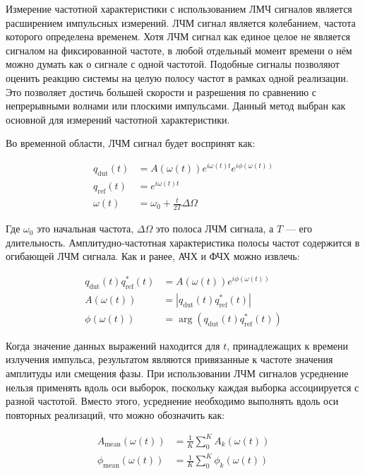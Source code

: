 \documentclass{report}
\begin{document}
Измерение частотной характеристики с использованием ЛМЧ сигналов является расширением импульсных измерений. ЛЧМ сигнал является колебанием, частота которого определена временем. Хотя ЛЧМ сигнал как единое целое не является сигналом на фиксированной частоте, в любой отдельный момент времени о нём можно думать как о сигнале с одной частотой. Подобные сигналы позволяют оценить реакцию системы на целую полосу частот в рамках одной реализации. Это позволяет достичь большей скорости и разрешения по сравнению с непрерывными волнами или плоскими импульсами. Данный метод выбран как основной для измерений частотной характеристики.

Во временной области, ЛЧМ сигнал будет воспринят как:

\begin{align}
q_\text{dut}(t) &= A(\omega(t)) e^{i \omega(t) t} e^{i \phi(\omega(t)) } \\
q_\text{ref}(t) &= e^{i \omega(t) t} \\
\omega(t) &= \omega_0 + \frac{t}{2T} \Delta \Omega
\end{align}

Где $\omega_0$ это начальная частота, $\Delta \Omega$ это полоса ЛЧМ сигнала, а $T$ --- его длительность. Амплитудно-частотная характеристика полосы частот содержится в огибающей ЛЧМ сигнала. Как и ранее, АЧХ и ФЧХ можно извлечь:

\begin{align}
q_\text{dut}(t) q^*_\text{ref}(t) &= A(\omega(t)) e^{i \phi(\omega(t)) } \\
A(\omega(t)) &= \left| q_\text{dut}(t) q^*_\text{ref}(t) \right| \\
\phi(\omega(t)) &= \arg\left( q_\text{dut}(t) q^*_\text{ref}(t) \right)
\end{align}

Когда значение данных выражений находится для $t$, принадлежащих к времени излучения импульса, результатом являются привязанные к частоте значения амплитуды или смещения фазы. При использовании ЛЧМ сигналов усреднение нельзя применять вдоль оси выборок, поскольку каждая выборка ассоциируется с разной частотой. Вместо этого, усреднение необходимо выполнять вдоль оси повторных реализаций, что можно обозначить как:

\begin{align}
A_\text{mean}(\omega(t)) &= \frac{1}{K} \sum_{0}^{K} A_k(\omega(t)) \\
\phi_\text{mean}(\omega(t)) &= \frac{1}{K} \sum_{0}^{K} \phi_k(\omega(t))
\end{align}
\end{document}
